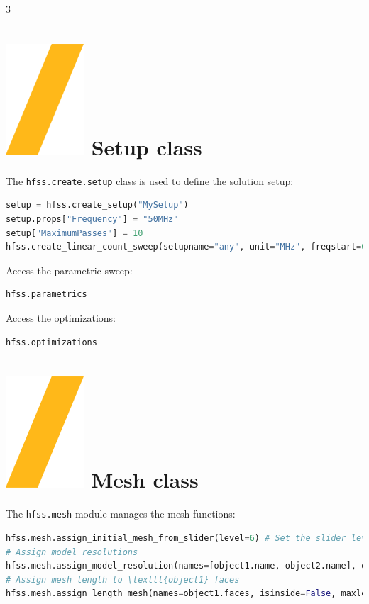 \documentclass[9pt,landscape]{article}
\begin{document}
\begin{multicols}{3}
\section{\includegraphics[height=\fontcharht\font`\S]{slash.png} Setup class}
The \texttt{hfss.create.setup} class is used to define the solution setup:

\begin{lstlisting}[language=Python]
setup = hfss.create_setup("MySetup")
setup.props["Frequency"] = "50MHz"
setup["MaximumPasses"] = 10
hfss.create_linear_count_sweep(setupname="any", unit="MHz", freqstart=0.1, freqstop=100, num_of_freq_points=100, sweepname="sweep1", sweep_type="Interpolating", save_fields=False)
\end{lstlisting}
Access the parametric sweep:
\begin{lstlisting}[language=Python]
hfss.parametrics
\end{lstlisting}
Access the optimizations:
\begin{lstlisting}[language=Python]
hfss.optimizations
\end{lstlisting}
\columnbreak
\section{\includegraphics[height=\fontcharht\font`\S]{slash.png} Mesh class}
The \texttt{hfss.mesh} module manages the mesh functions:
\begin{lstlisting}[language=Python]
hfss.mesh.assign_initial_mesh_from_slider(level=6) # Set the slider level to 6
# Assign model resolutions
hfss.mesh.assign_model_resolution(names=[object1.name, object2.name], defeature_length=None)
# Assign mesh length to \texttt{object1} faces
hfss.mesh.assign_length_mesh(names=object1.faces, isinside=False, maxlength=1, maxel=2000)
\end{lstlisting}


\end{multicols}
\end{document}
